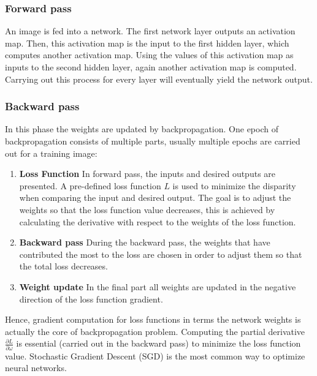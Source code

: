     \subsubsection{Forward pass}
    An image is fed into a network. The first network layer outputs an activation map. Then, this activation map is the input to the first hidden layer, which computes another activation map. Using the values of this activation map as inputs to the second hidden layer, again another activation map is computed. Carrying out this process for every layer will eventually yield the network output.

    \subsubsection{Backward pass}
    In this phase the weights are updated by backpropagation. One epoch of backpropagation consists of multiple parts, usually multiple epochs are carried out for a training image:
    \begin{enumerate}
        \item \textbf{Loss Function} In forward pass, the inputs and desired outputs are presented. A pre-defined loss function $L$ is used to minimize the disparity when comparing the input and desired output. The goal is to adjust the weights so that the loss function value decreases, this is achieved by calculating the derivative with respect to the weights of the loss function.
        \item \textbf{Backward pass} During the backward pass, the weights that have contributed the most to the loss are chosen in order to adjust them so that the total loss decreases.
        \item \textbf{Weight update} In the final part all weights are updated in the negative direction of the loss function gradient.
    \end{enumerate}
    
    Hence, gradient computation for loss functions in terms the network weights is actually the core of backpropagation problem. Computing the partial derivative $\frac{\partial L}{\partial \omega}$ is essential (carried out in the backward pass) to minimize the loss function value. Stochastic Gradient Descent (SGD) is the most common way to optimize neural networks.


